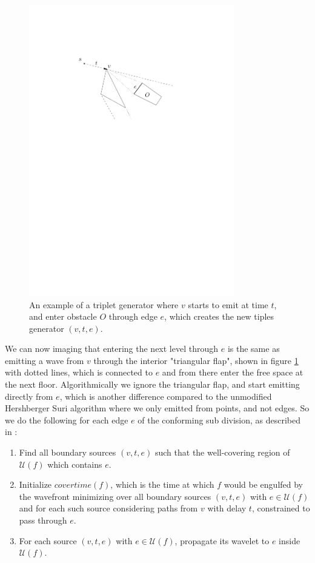 \begin{figure}[H]
	\centering
	\includegraphics[width=0.8\textwidth]{figures/tripletgenerator.pdf}
	\caption{An example of a triplet generator where $v$ starts to emit at time $t$, and enter obstacle $O$ through edge $e$, which 
	         creates the new tiples generator $(v,t,e)$. }
	\label{fig:tripletgenerator}
\end{figure}

We can now imaging that entering the next level through $e$ is the same as emitting a wave from $v$ through the interior "triangular 
flap", shown in figure \ref{fig:tripletgenerator} with dotted lines, which is connected to $e$ and from there enter the free space at the 
next floor. Algorithmically we ignore the triangular flap, and start emitting directly from $e$, which is another difference compared to 
the unmodified Hershberger Suri algorithm where we only emitted from points, and not edges. So we do the following for each edge $e$ of 
the conforming sub division, as described in \cite{HershbergerKS17}:

\begin{enumerate}
    \item Find all boundary sources $(v,t,e)$ such that the well-covering region of $\mathcal{U}(f)$ which contains $e$.
    \item Initialize $covertime(f)$, which is the time at which $f$ would be engulfed by the wavefront minimizing over all boundary 
          sources $(v,t,e)$ with $e \in \mathcal{U}(f)$ and for each such source considering paths from $v$ with delay $t$, constrained to
          pass through $e$.
    \item For each source $(v,t,e)$ with $e \in \mathcal{U}(f)$, propagate its wavelet to $e$ inside $\mathcal{U}(f)$.
\end{enumerate}

